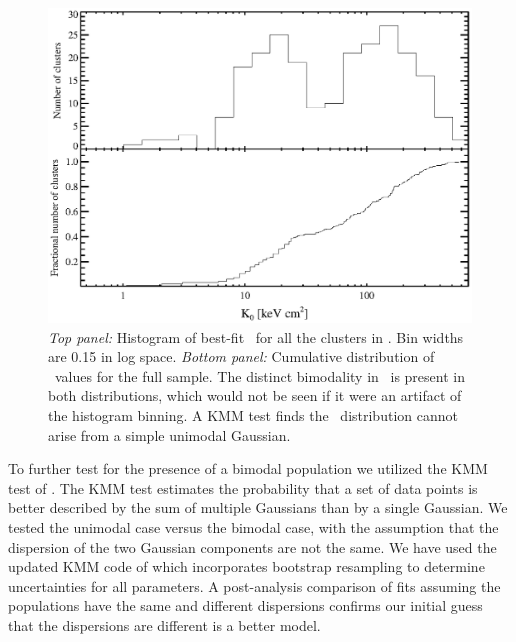 \begin{figure}[htp]
  \begin{center}
    \begin{minipage}[htp]{\linewidth}
      \includegraphics*[width=\textwidth, trim=20mm 10mm 10mm 10mm, clip]{k0hist}
      \caption[Histogram and cumulative distribution of best-fit
        \kna\ for full \accept\ sample.]{{\it{Top panel:}} Histogram
        of best-fit \kna\ for all the clusters in \accept. Bin widths
        are 0.15 in log space.  {\it{Bottom panel:}} Cumulative
        distribution of \kna\ values for the full sample. The distinct
        bimodality in \kna\ is present in both distributions, which
        would not be seen if it were an artifact of the histogram
        binning. A KMM test finds the \kna\ distribution cannot arise
        from a simple unimodal Gaussian.}
      \label{fig:k0hist}
    \end{minipage}
  \end{center}
\end{figure}

To further test for the presence of a bimodal population we utilized
the KMM test of \citet{kmm1}. The KMM test estimates the probability
that a set of data points is better described by the sum of multiple
Gaussians than by a single Gaussian. We tested the unimodal case
versus the bimodal case, with the assumption that the dispersion of
the two Gaussian components are not the same. We have used the updated
KMM code of \citet{kmm2} which incorporates bootstrap resampling to
determine uncertainties for all parameters. A post-analysis comparison
of fits assuming the populations have the same and different
dispersions confirms our initial guess that the dispersions are
different is a better model.

